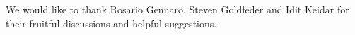 We would like to thank Rosario Gennaro, Steven Goldfeder and Idit Keidar for their fruitful discussions and helpful suggestions.